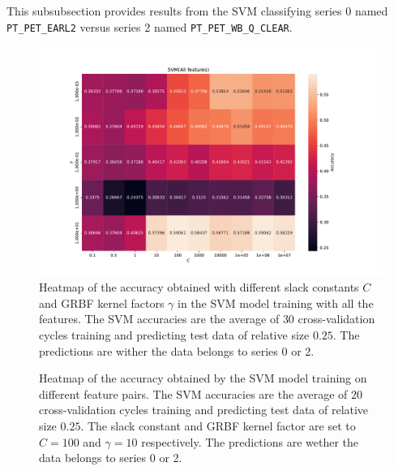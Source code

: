 This subsubsection provides results from the SVM classifying series 0 named \verb|PT_PET_EARL2|
versus series 2 named \verb|PT_PET_WB_Q_CLEAR|. 

\begin{figure}[H]
\centering
\includegraphics[width=1\textwidth]{Figures/accuracy(C,gamma)1}
\caption{Heatmap of the accuracy obtained with different slack constants $C$ and 
GRBF kernel factors $\gamma $ in the SVM model training with all the features. The SVM accuracies are the average of $30$ cross-validation 
cycles training and predicting test data of relative size $0.25$.
 The predictions are wither the data belongs to series 0 or 2.}

\label{fig:Figures-accuracy-C-gamma-1}
\end{figure}

\begin{figure}[H]
\centering
{}
\caption{Heatmap of the accuracy obtained by the SVM model training on different feature pairs. The SVM accuracies are the average 
of $20$ cross-validation cycles training and predicting test data of relative size $0.25$.
The slack constant and GRBF kernel factor are set to $C=100$ and $\gamma=10 $ respectively. 
 The predictions are wether the data belongs to series 0 or 2.}
\label{fig:Figures-feature_pairs1}
\end{figure}

